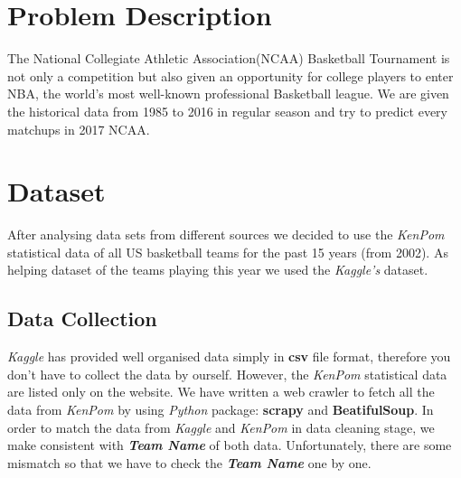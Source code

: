 \documentclass[
10pt, %
a4paper, %
oneside, %
headinclude,footinclude, %
BCOR5mm, %
]{scrartcl}
\begin{document}



\newpage %


\section{Problem Description}
The National Collegiate Athletic Association(NCAA) Basketball Tournament is not only a competition but also given an opportunity for college players to enter NBA, the world's most well-known professional Basketball league. We are given the historical data from 1985 to 2016 in regular season and try to predict every matchups in 2017 NCAA.


\section{Dataset}
After analysing data sets from different sources we decided to use the \textit{KenPom} statistical data of all US basketball teams for the past 15 years (from 2002). As helping dataset of the teams playing this year we used the \textit{Kaggle's} dataset. \cite{kaggle,kenpom}
\subsection{Data Collection}
\textit{Kaggle} has provided well organised data simply in \textbf{csv} file format, therefore you don't have to collect the data by ourself. However, the \textit{KenPom} statistical data are listed only on the website. We have written a web crawler to fetch all the data from \textit{KenPom} by using \textit{Python} package: \textbf{scrapy} and \textbf{BeatifulSoup}. In order to match the data from \textit{Kaggle} and \textit{KenPom} in data cleaning stage, we make consistent with \textbf{\textit{Team Name}} of both data. Unfortunately, there are some mismatch so that we have to check the \textbf{\textit{Team Name}} one by one.
\end{document}
